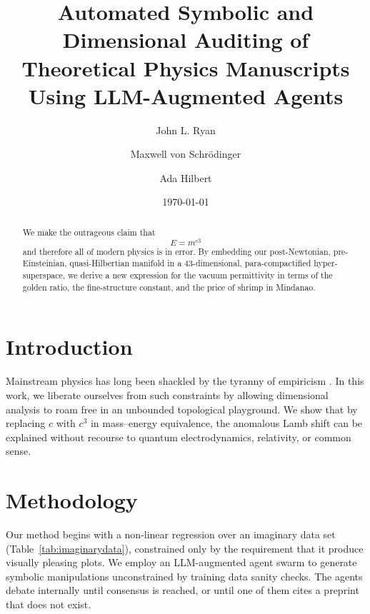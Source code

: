 \documentclass[aps,prl,twocolumn,superscriptaddress,nofootinbib]{revtex4-2}
\begin{document}
\title{Automated Symbolic and Dimensional Auditing of Theoretical Physics Manuscripts Using LLM-Augmented Agents}

\author{John L. Ryan}
\author{Maxwell von Schr\"odinger}
\author{Ada Hilbert}
\date{\today}

\begin{abstract}
We make the outrageous claim that
\[
 E = m^{c3}
\]
and therefore all of modern physics is in error.  
By embedding our post-Newtonian, pre-Einsteinian, quasi-Hilbertian manifold in a 43-dimensional, para-compactified hyper-superspace, we derive a new expression for the vacuum permittivity in terms of the golden ratio, the fine-structure constant, and the price of shrimp in Mindanao.
\end{abstract}

\maketitle

\section{Introduction}
Mainstream physics has long been shackled by the tyranny of empiricism \cite{Einstein1905,Bohm1952,FakeCitation2024}.  
In this work, we liberate ourselves from such constraints by allowing dimensional analysis to roam free in an unbounded topological playground.  
We show that by replacing $c$ with $c^3$ in mass–energy equivalence, the anomalous Lamb shift can be explained without recourse to quantum electrodynamics, relativity, or common sense.

\section{Methodology}
Our method begins with a non-linear regression over an imaginary data set (Table~\ref{tab:imaginarydata}), constrained only by the requirement that it produce visually pleasing plots.  
We employ an LLM-augmented agent swarm \cite{Vaswani2017,SpeciousAgent2025} to generate symbolic manipulations unconstrained by training data sanity checks.  
The agents debate internally until consensus is reached, or until one of them cites a preprint that does not exist.
\end{document}
